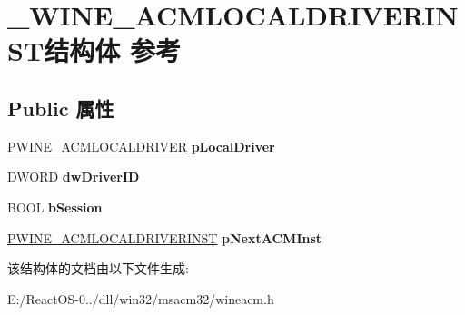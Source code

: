 \hypertarget{struct___w_i_n_e___a_c_m_l_o_c_a_l_d_r_i_v_e_r_i_n_s_t}{}\section{\+\_\+\+W\+I\+N\+E\+\_\+\+A\+C\+M\+L\+O\+C\+A\+L\+D\+R\+I\+V\+E\+R\+I\+N\+S\+T结构体 参考}
\label{struct___w_i_n_e___a_c_m_l_o_c_a_l_d_r_i_v_e_r_i_n_s_t}
\subsection*{Public 属性}
\begin{DoxyCompactItemize}
\item 
\mbox{\label{struct___w_i_n_e___a_c_m_l_o_c_a_l_d_r_i_v_e_r_i_n_s_t_a5f96ffb8042fda22b54b51e85f0e7afb}} 
\hyperlink{struct___w_i_n_e___a_c_m_l_o_c_a_l_d_r_i_v_e_r}{P\+W\+I\+N\+E\+\_\+\+A\+C\+M\+L\+O\+C\+A\+L\+D\+R\+I\+V\+ER} {\bfseries p\+Local\+Driver}
\item 
\mbox{\label{struct___w_i_n_e___a_c_m_l_o_c_a_l_d_r_i_v_e_r_i_n_s_t_ad5f3afb5d9bc9dd4c4ac1e60746235a9}} 
D\+W\+O\+RD {\bfseries dw\+Driver\+ID}
\item 
\mbox{\label{struct___w_i_n_e___a_c_m_l_o_c_a_l_d_r_i_v_e_r_i_n_s_t_af3d6adab927c3a84c0ff47ddcbf7c23f}} 
B\+O\+OL {\bfseries b\+Session}
\item 
\mbox{\label{struct___w_i_n_e___a_c_m_l_o_c_a_l_d_r_i_v_e_r_i_n_s_t_a2fedbd6f8382feb2fd6ca934c8cee293}} 
\hyperlink{struct___w_i_n_e___a_c_m_l_o_c_a_l_d_r_i_v_e_r_i_n_s_t}{P\+W\+I\+N\+E\+\_\+\+A\+C\+M\+L\+O\+C\+A\+L\+D\+R\+I\+V\+E\+R\+I\+N\+ST} {\bfseries p\+Next\+A\+C\+M\+Inst}
\end{DoxyCompactItemize}


该结构体的文档由以下文件生成\+:\begin{DoxyCompactItemize}
\item 
E\+:/\+React\+O\+S-\/0../dll/win32/msacm32/wineacm.\+h\end{DoxyCompactItemize}
